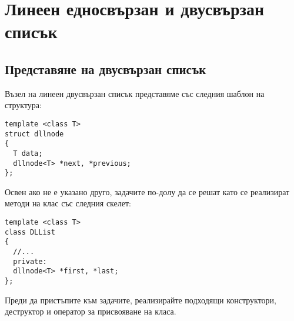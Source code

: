 \clearpage\section {Линеен едносвързан и двусвързан списък}

\subsection {Представяне на двусвързан списък}

\begin{mdframed}[hidealllines=true,backgroundcolor=gray!20]
Възел на линеен двусвързан списък представяме със следния шаблон на структура:
\begin{verbatim}
template <class T>
struct dllnode
{
  T data;
  dllnode<T> *next, *previous;
};
\end{verbatim}
Освен ако не е указано друго, задачите по-долу да се решат като се реализират методи на клас  със следния скелет:
\begin{verbatim}
template <class T>
class DLList
{
  //...
  private:
  dllnode<T> *first, *last;
};
\end{verbatim}
Преди да пристъпите към задачите, реализирайте подходящи конструктори, деструктор и оператор за присвояване на класа.
\end{mdframed}

